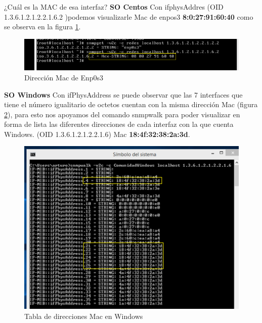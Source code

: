 \item ¿Cuál es la MAC de esa interfaz?
\textbf{SO Centos}
Con ifphysAddres (OID 1.3.6.1.2.1.2.2.1.6.2 )podemos visualizarle Mac de enpos3 \textbf{8:0:27:91:60:40} como se observa en la figura  \ref{image:Pregunta6C}.

 \FloatBarrier
\begin{figure}[htbp!]
		\centering
		    \includegraphics[width=.9 \textwidth]{../images/Pregunta6C.png} 
		\caption{Dirección Mac de Enp0s3}
		\label{image:Pregunta6C}
\end{figure}
\FloatBarrier

\textbf{SO Windows}
Con ifPhysAddress se puede observar que las 7 interfaces que tiene el número igualitario de octetos cuentan con la misma dirección Mac (figura  \ref{image:Pregunta6W}), para esto nos apoyamos del comando snmpwalk para poder visualizar en forma de lista las diferentes direcciones de cada interfaz con la que cuenta Windows. (OID 1.3.6.1.2.1.2.2.1.6)
Mac \textbf{18:4f:32:38:2a:3d}.

 \FloatBarrier
\begin{figure}[htbp!]
		\centering
		    \includegraphics[width=.8 \textwidth]{../images/Pregunta6W.png} 
		\caption{Tabla de direcciones Mac en Windows}
		\label{image:Pregunta6W}
\end{figure}
\FloatBarrier